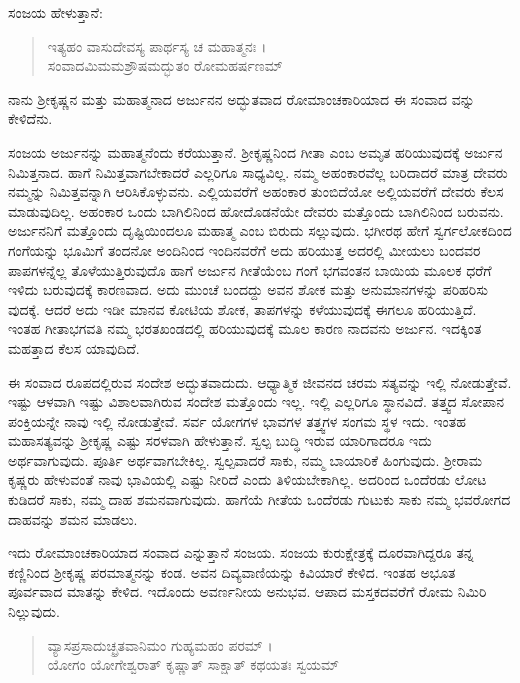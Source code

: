 ಸಂಜಯ ಹೇಳುತ್ತಾನೆ:

\begin{verse}
ಇತ್ಯಹಂ ವಾಸುದೇವಸ್ಯ ಪಾರ್ಥಸ್ಯ ಚ ಮಹಾತ್ಮನಃ ।\\ಸಂವಾದಮಿಮಮಶ್ರೌಷಮದ್ಭುತಂ ರೋಮಹರ್ಷಣಮ್ 
\end{verse}

{\small ನಾನು ಶ್ರೀಕೃಷ್ಣನ ಮತ್ತು ಮಹಾತ್ಮನಾದ ಅರ್ಜುನನ ಅದ್ಭುತವಾದ ರೋಮಾಂಚಕಾರಿಯಾದ ಈ ಸಂವಾದ ವನ್ನು ಕೇಳಿದೆನು.}

ಸಂಜಯ ಅರ್ಜುನನ್ನು ಮಹಾತ್ಮನೆಂದು ಕರೆಯುತ್ತಾನೆ. ಶ್ರೀಕೃಷ್ಣನಿಂದ ಗೀತಾ ಎಂಬ ಅಮೃತ ಹರಿಯುವುದಕ್ಕೆ ಅರ್ಜುನ ನಿಮಿತ್ತನಾದ. ಹಾಗೆ ನಿಮಿತ್ತವಾಗಬೇಕಾದರೆ ಎಲ್ಲರಿಗೂ ಸಾಧ್ಯವಿಲ್ಲ. ನಮ್ಮ ಅಹಂಕಾರವೆಲ್ಲ ಬರಿದಾದರೆ ಮಾತ್ರ ದೇವರು ನಮ್ಮನ್ನು ನಿಮಿತ್ತವನ್ನಾಗಿ ಆರಿಸಿಕೊಳ್ಳುವನು. ಎಲ್ಲಿಯವರೆಗೆ ಅಹಂಕಾರ ತುಂಬಿದೆಯೋ ಅಲ್ಲಿಯವರೆಗೆ ದೇವರು ಕೆಲಸ ಮಾಡುವುದಿಲ್ಲ. ಅಹಂಕಾರ ಒಂದು ಬಾಗಿಲಿನಿಂದ ಹೋದೊಡನೆಯೇ ದೇವರು ಮತ್ತೊಂದು ಬಾಗಿಲಿನಿಂದ ಬರುವನು. ಅರ್ಜುನನಿಗೆ ಮತ್ತೊಂದು ದೃಷ್ಟಿಯಿಂದಲೂ ಮಹಾತ್ಮ ಎಂಬ ಬಿರುದು ಸಲ್ಲುವುದು. ಭಗೀರಥ ಹೇಗೆ ಸ್ವರ್ಗಲೋಕದಿಂದ ಗಂಗೆಯನ್ನು ಭೂಮಿಗೆ ತಂದನೋ ಅಂದಿನಿಂದ ಇಂದಿನವರೆಗೆ ಅದು ಹರಿಯುತ್ತ ಅದರಲ್ಲಿ ಮೀಯಲು ಬಂದವರ ಪಾಪಗಳನ್ನೆಲ್ಲ ತೊಳೆಯುತ್ತಿರುವುದೊ ಹಾಗೆ ಅರ್ಜುನ ಗೀತೆಯೆಂಬ ಗಂಗೆ ಭಗವಂತನ ಬಾಯಿಯ ಮೂಲಕ ಧರೆಗೆ ಇಳಿದು ಬರುವುದಕ್ಕೆ ಕಾರಣವಾದ. ಅದು ಮುಂಚೆ ಬಂದದ್ದು ಅವನ ಶೋಕ ಮತ್ತು ಅನುಮಾನಗಳನ್ನು ಪರಿಹರಿಸು ವುದಕ್ಕೆ. ಆದರೆ ಅದು ಇಡೀ ಮಾನವ ಕೋಟಿಯ ಶೋಕ, ತಾಪಗಳನ್ನು ಕಳೆಯುವುದಕ್ಕೆ ಈಗಲೂ ಹರಿಯುತ್ತಿದೆ. ಇಂತಹ ಗೀತಾಭಗವತಿ ನಮ್ಮ ಭರತಖಂಡದಲ್ಲಿ ಹರಿಯುವುದಕ್ಕೆ ಮೂಲ ಕಾರಣ ನಾದವನು ಅರ್ಜುನ. ಇದಕ್ಕಿಂತ ಮಹತ್ತಾದ ಕೆಲಸ ಯಾವುದಿದೆ.

ಈ ಸಂವಾದ ರೂಪದಲ್ಲಿರುವ ಸಂದೇಶ ಅದ್ಭುತವಾದುದು. ಆಧ್ಯಾತ್ಮಿಕ ಜೀವನದ ಚರಮ ಸತ್ಯವನ್ನು ಇಲ್ಲಿ ನೋಡುತ್ತೇವೆ. ಇಷ್ಟು ಆಳವಾಗಿ ಇಷ್ಟು ವಿಶಾಲವಾಗಿರುವ ಸಂದೇಶ ಮತ್ತೊಂದು ಇಲ್ಲ. ಇಲ್ಲಿ ಎಲ್ಲರಿಗೂ ಸ್ಥಾನವಿದೆ. ತತ್ತ್ವದ ಸೋಪಾನ ಪಂಕ್ತಿಯನ್ನೇ ನಾವು ಇಲ್ಲಿ ನೋಡುತ್ತೇವೆ. ಸರ್ವ ಯೋಗಗಳ ಭಾವಗಳ ತತ್ತ್ವಗಳ ಸಂಗಮ ಸ್ಥಳ ಇದು. ಇಂತಹ ಮಹಾಸತ್ಯವನ್ನು ಶ್ರೀಕೃಷ್ಣ ಎಷ್ಟು ಸರಳವಾಗಿ ಹೇಳುತ್ತಾನೆ. ಸ್ವಲ್ಪ ಬುದ್ಧಿ ಇರುವ ಯಾರಿಗಾದರೂ ಇದು ಅರ್ಥವಾಗುವುದು. ಪೂರ್ತಿ ಅರ್ಥವಾಗಬೇಕಿಲ್ಲ. ಸ್ವಲ್ಪವಾದರೆ ಸಾಕು, ನಮ್ಮ ಬಾಯಾರಿಕೆ ಹಿಂಗುವುದು. ಶ್ರೀರಾಮ ಕೃಷ್ಣರು ಹೇಳುವಂತೆ ನಾವು ಭಾವಿಯಲ್ಲಿ ಎಷ್ಟು ನೀರಿದೆ ಎಂದು ತಿಳಿಯಬೇಕಾಗಿಲ್ಲ. ಅದರಿಂದ ಒಂದೆರಡು ಲೋಟ ಕುಡಿದರೆ ಸಾಕು, ನಮ್ಮ ದಾಹ ಶಮನವಾಗುವುದು. ಹಾಗೆಯೆ ಗೀತೆಯ ಒಂದೆರಡು ಗುಟುಕು ಸಾಕು ನಮ್ಮ ಭವರೋಗದ ದಾಹವನ್ನು ಶಮನ ಮಾಡಲು.

ಇದು ರೋಮಾಂಚಕಾರಿಯಾದ ಸಂವಾದ ಎನ್ನುತ್ತಾನೆ ಸಂಜಯ. ಸಂಜಯ ಕುರುಕ್ಷೇತ್ರಕ್ಕೆ ದೂರವಾಗಿದ್ದರೂ ತನ್ನ ಕಣ್ಣಿನಿಂದ ಶ್ರೀಕೃಷ್ಣ ಪರಮಾತ್ಮನನ್ನು ಕಂಡ. ಅವನ ದಿವ್ಯವಾಣಿಯನ್ನು ಕಿವಿಯಾರೆ ಕೇಳಿದ. ಇಂತಹ ಅಭೂತ ಪೂರ್ವವಾದ ಮಾತನ್ನು ಕೇಳಿದ. ಇದೊಂದು ಅವರ್ಣನೀಯ ಅನುಭವ. ಆಪಾದ ಮಸ್ತಕದವರೆಗೆ ರೋಮ ನಿಮಿರಿ ನಿಲ್ಲುವುದು.

\begin{verse}
ವ್ಯಾಸಪ್ರಸಾದುಚ್ಛ್ರತವಾನಿಮಂ ಗುಹ್ಯಮಹಂ ಪರಮ್ ।\\ಯೋಗಂ ಯೋಗೇಶ್ವರಾತ್ ಕೃಷ್ಣಾತ್ ಸಾಕ್ಷಾತ್ ಕಥಯತಃ ಸ್ವಯಮ್ 
\end{verse}

